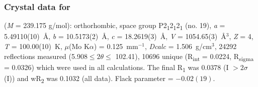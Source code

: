 \begin{refsection}
\subsubsection{Crystal data for \texorpdfstring{}{C9H9N3O5}}
 (\emph{M} = 239.175 g/mol): orthorhombic, space group P2\textsubscript{1}2\textsubscript{1}2\textsubscript{1} (no. 19), \emph{a} = 5.49110(10)~\AA, \emph{b} = 10.5173(2)~\AA, \emph{c} = 18.2619(3)~\AA, \emph{V} = 1054.65(3)~\AA$^3$, \emph{Z} = 4, \emph{T} = 100.00(10)~K, $\mu$(Mo K$\alpha$) = 0.125~mm$^{-1}$, \emph{Dcalc} = 1.506~g/cm$^3$, 24292 reflections measured (5.908\degree $\leq 2\theta \leq$ 102.41\degree), 10696 unique (R\textsubscript{int} = 0.0224, R\textsubscript{sigma} = 0.0326) which were used in all calculations. The final R\textsubscript{1} was 0.0378 (I $> 2\sigma$(I)) and wR\textsubscript{2} was 0.1032 (all data). Flack parameter = $-0.02(19)$.

\printbibliography
\end{refsection}

